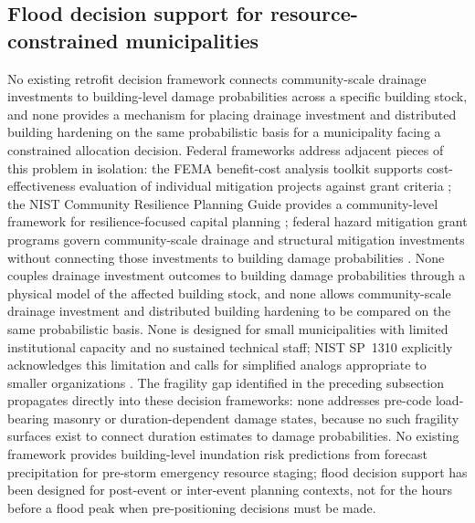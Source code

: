 \documentclass[11pt]{article}
\begin{document}
\subsection{Flood decision support for resource-constrained municipalities}
No existing retrofit decision framework connects community-scale drainage investments
to building-level damage probabilities across a specific building stock, and none
provides a mechanism for placing drainage investment and distributed building
hardening on the same probabilistic basis for a municipality facing a constrained
allocation decision.
Federal frameworks address adjacent pieces of this problem in isolation: the FEMA
benefit-cost analysis toolkit supports cost-effectiveness evaluation of individual
mitigation projects against grant criteria \cite{placeholder_fema_bca}; the NIST
Community Resilience Planning Guide provides a community-level framework for
resilience-focused capital planning \cite{placeholder_nist_crhp}; federal hazard
mitigation grant programs govern community-scale drainage and structural mitigation
investments without connecting those investments to building damage probabilities
\cite{placeholder_fema_hmgp}.
None couples drainage investment outcomes to building damage probabilities through
a physical model of the affected building stock, and none allows community-scale
drainage investment and distributed building hardening to be compared on the same
probabilistic basis.
None is designed for small municipalities with limited institutional capacity and
no sustained technical staff; NIST SP~1310 explicitly acknowledges this limitation
and calls for simplified analogs appropriate to smaller organizations
\cite[Sec.~6.1.3]{davis2024nist}.
The fragility gap identified in the preceding subsection propagates directly into
these decision frameworks: none addresses pre-code load-bearing masonry or
duration-dependent damage states, because no such fragility surfaces exist to
connect duration estimates to damage probabilities.
No existing framework provides building-level inundation risk predictions from
forecast precipitation for pre-storm emergency resource staging; flood decision
support has been designed for post-event or inter-event planning contexts, not
for the hours before a flood peak when pre-positioning decisions must be made.
\end{document}
